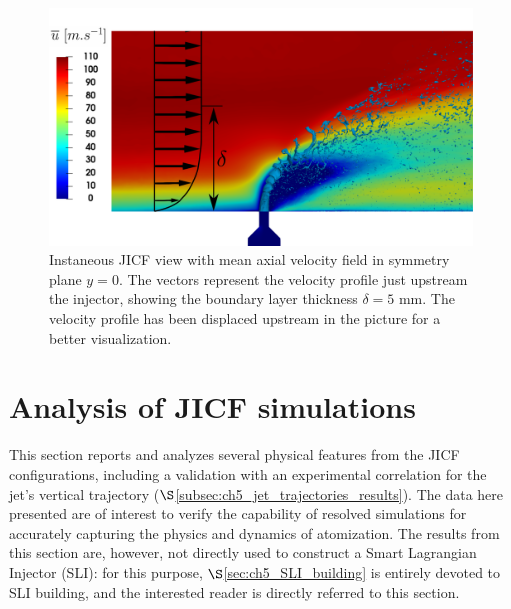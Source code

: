 \begin{figure}[ht]
\centering
\includegraphics[scale=0.2]{./part2_developments/figures_ch5_resolved_JICF/Umean_profile_with_jet_in_BL}
\caption[Instaneous JICF view with mean axial velocity field in symmetry plane $y = 0$]{Instaneous JICF view with mean axial velocity field in symmetry plane $y = 0$. The vectors represent the velocity profile just upstream the injector, showing the boundary layer thickness $\delta = 5$ mm. The velocity profile has been displaced upstream in the picture for a better visualization.}
\label{fig:Umean_profile_with_jet}
\end{figure}



\clearpage

\section{Analysis of JICF simulations}
\label{sec:ch5_JICF_simus_analysis}

This section reports and analyzes several physical features from the JICF configurations, including a validation with an experimental correlation for the jet's vertical trajectory ($\S$\ref{subsec:ch5_jet_trajectories_results}). The data here presented are of interest to verify the capability of resolved simulations for accurately capturing the physics and dynamics of atomization. The results from this section are, however, not directly used to construct a Smart Lagrangian Injector (SLI): for this purpose, $\S$\ref{sec:ch5_SLI_building} is entirely devoted to SLI building, and the interested reader is directly referred to this section.

